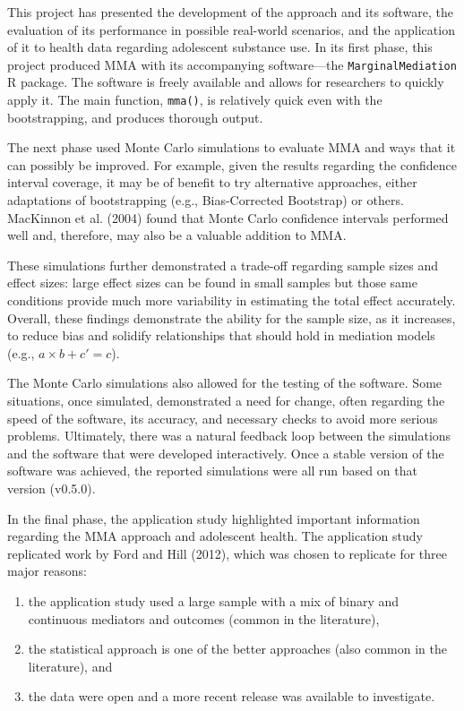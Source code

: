 \documentclass[]{DissertateUSU}
\providecommand{\tightlist}{%
  \setlength{\itemsep}{0pt}\setlength{\parskip}{0pt}}
\begin{document}
This project has presented the development of the approach and its
software, the evaluation of its performance in possible real-world
scenarios, and the application of it to health data regarding adolescent
substance use. In its first phase, this project produced MMA with its
accompanying software---the \texttt{MarginalMediation} R package. The
software is freely available and allows for researchers to quickly apply
it. The main function, \texttt{mma()}, is relatively quick even with the
bootstrapping, and produces thorough output.

The next phase used Monte Carlo simulations to evaluate MMA and ways
that it can possibly be improved. For example, given the results
regarding the confidence interval coverage, it may be of benefit to try
alternative approaches, either adaptations of bootstrapping (e.g.,
Bias-Corrected Bootstrap) or others. MacKinnon et al. (2004) found that
Monte Carlo confidence intervals performed well and, therefore, may also
be a valuable addition to MMA.

These simulations further demonstrated a trade-off regarding sample
sizes and effect sizes: large effect sizes can be found in small samples
but those same conditions provide much more variability in estimating
the total effect accurately. Overall, these findings demonstrate the
ability for the sample size, as it increases, to reduce bias and
solidify relationships that should hold in mediation models (e.g.,
\(a \times b + c' = c\)).

The Monte Carlo simulations also allowed for the testing of the
software. Some situations, once simulated, demonstrated a need for
change, often regarding the speed of the software, its accuracy, and
necessary checks to avoid more serious problems. Ultimately, there was a
natural feedback loop between the simulations and the software that were
developed interactively. Once a stable version of the software was
achieved, the reported simulations were all run based on that version
(v0.5.0).

In the final phase, the application study highlighted important
information regarding the MMA approach and adolescent health. The
application study replicated work by Ford and Hill (2012), which was
chosen to replicate for three major reasons:

\begin{enumerate}
\def\labelenumi{\arabic{enumi}.}
\tightlist
\item
  the application study used a large sample with a mix of binary and
  continuous mediators and outcomes (common in the literature),
\item
  the statistical approach is one of the better approaches (also common
  in the literature), and
\item
  the data were open and a more recent release was available to
  investigate.
\end{enumerate}
\end{document}
